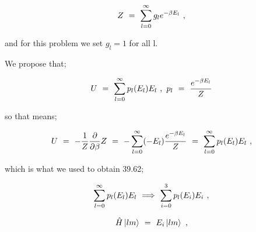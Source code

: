 \documentclass{article}
\begin{document}
\begin{equation} \label{eb-eq-276-1}
Z \hspace{0.125cm} = \hspace{0.125cm} \sum_{l=0}^{\infty} g_{l} e^{-\beta E_{l}} \hspace{0.125cm} , 
\end{equation} 

and for this problem we set \begin{math} g_{l} = 1 \end{math} for all l.

We propose that;

\begin{equation} \label{eb-eq-277-1}
U \hspace{0.125cm} = \hspace{0.125cm} \sum_{l=0}^{\infty} p_{l}(E_{l}) E_{l} \hspace{0.125cm} , \hspace{0.125cm} p_{l} \hspace{0.125cm} = \hspace{0.125cm} \frac{e^{-\beta E_{l}}}{Z}
\end{equation} 

so that means;

\begin{equation} \label{eb-eq-278-1}
U \hspace{0.125cm} = \hspace{0.125cm} -\frac{1}{Z}\frac{\partial}{\partial{\beta}} Z \hspace{0.125cm} = \hspace{0.125cm} - \sum_{l=0}^{\infty} (-E_{l}) \frac{e^{-\beta E_{l}}}{Z}  \hspace{0.125cm} = \hspace{0.125cm} \sum_{l=0}^{\infty} p_{l}(E_{l}) E_{l} \hspace{0.125cm}, 
\end{equation}

which is what we used to obtain 39.62;
 
\begin{equation} \label{eb-eq-279-1}
\sum_{l=0}^{\infty} p_{l}(E_{l}) E_{l} \hspace{0.125cm} \Longrightarrow \hspace{0.125cm} \sum_{i=0}^{3} p_{l}(E_{i}) E_{i} \hspace{0.125cm} ,
\end{equation}

\begin{equation} \label{eb-eq-280-1}
\hat{H} \ket{l m} \hspace{0.125cm} = \hspace{0.125cm} E_{i} \ket{l m} \hspace{0.125cm} ,
\end{equation}
\end{document}
